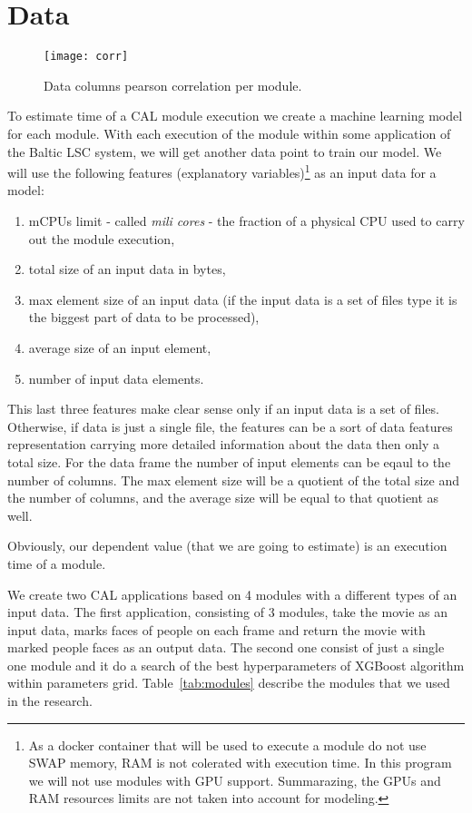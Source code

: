 \section{Data}
\begin{figure*}[!t]
	\centering
	\begin{minipage}{0.75\linewidth}
		\texttt{[image: corr]}
	\end{minipage}
	\caption{Data columns pearson correlation per module.}
	\label{fig:corr}
\end{figure*}

To estimate time of a CAL module execution we create a machine learning model for each module. With each execution of the module within some application of the Baltic LSC system, we will get another data point to train our model. We will use the following features (explanatory variables)\footnote{As a docker container that will be used to execute a module do not use SWAP memory, RAM is not colerated with execution time. In this program we will not use modules with GPU support. Summarazing, the GPUs and RAM resources limits are not taken into account for modeling.} as an input data for a model:
\begin{enumerate}
	\item mCPUs limit - called \textit{mili cores} - the fraction of a physical CPU used to carry out the module execution,
	\item total size of an input data in bytes,
	\item max element size of an input data (if the input data is a set of files type it is the biggest part of data to be processed),
	\item average size of an input element,
	\item number of input data elements.
\end{enumerate}
This last three features make clear sense only if an input data is a set of files. Otherwise, if data is just a single file, the features can be a sort of data features representation carrying more detailed information about the data then only a total size. For the data frame the number of input elements can be eqaul to the number of columns. The max element size will be a quotient of the total size and the number of columns, and the average size will be equal to that quotient as well.

Obviously, our dependent value (that we are going to estimate) is an execution time of a module.

We create two CAL applications based on 4 modules with a different types of an input data. The first application, consisting of 3 modules, take the movie as an input data, marks faces of people on each frame and return the movie with marked people faces as an output data. The second one consist of just a single one module and it do a search of the best hyperparameters of XGBoost algorithm within parameters grid. Table~\ref{tab:modules} describe the modules that we used in the research.

